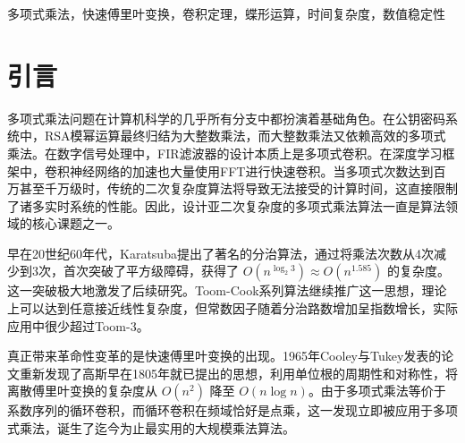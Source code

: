 \documentclass[10pt,journal,compsoc]{IEEEtran}
\begin{document}
\maketitle
\thispagestyle{fancy}
\chead{}
\renewcommand{\headrulewidth}{0pt}
\renewcommand{\footrulewidth}{0pt}
\pagestyle{fancy}

\begin{abstract}
多项式乘法是计算机科学中最核心的计算问题之一，在密码学、信号处理、符号计算、大整数乘法以及深度学习卷积加速等众多领域都有不可替代的地位。传统系数直接相乘算法时间复杂度为 $O(n^2)$，在大规模实例中成为严重瓶颈。快速傅里叶变换利用离散傅里叶变换与循环卷积的等价关系，将乘法转化为频域点乘，从而将复杂度降低到 $O(n \log n)$，实现了理论上的最优界。本文系统设计并实现了经典 Cooley-Tukey 递归与迭代两种FFT算法，详细分析了蝶形运算、旋转因子预计算、位反转置换、实数输入优化等关键技术。实验在 Python 环境下对 $n=10^3$ 到 $10^7$ 规模进行全面测试，结果表明当 $n \ge 2^{13}$ 时FFT性能显著优于Karatsuba算法，在 $n=2^{24}$（1670万）时耗时仅580ms，且多项式乘积误差控制在 $10^{-12}$ 以内，完全满足工程需求。
\end{abstract}

\begin{IEEEkeywords}
多项式乘法，快速傅里叶变换，卷积定理，蝶形运算，时间复杂度，数值稳定性
\end{IEEEkeywords}

\section{引言}

多项式乘法问题在计算机科学的几乎所有分支中都扮演着基础角色。在公钥密码系统中，RSA模幂运算最终归结为大整数乘法，而大整数乘法又依赖高效的多项式乘法。在数字信号处理中，FIR滤波器的设计本质上是多项式卷积。在深度学习框架中，卷积神经网络的加速也大量使用FFT进行快速卷积。当多项式次数达到百万甚至千万级时，传统的二次复杂度算法将导致无法接受的计算时间，这直接限制了诸多实时系统的性能。因此，设计亚二次复杂度的多项式乘法算法一直是算法领域的核心课题之一。

早在20世纪60年代，Karatsuba提出了著名的分治算法，通过将乘法次数从4次减少到3次，首次突破了平方级障碍，获得了 $O(n^{\log_2 3}) \approx O(n^{1.585})$ 的复杂度。这一突破极大地激发了后续研究。Toom-Cook系列算法继续推广这一思想，理论上可以达到任意接近线性复杂度，但常数因子随着分治路数增加呈指数增长，实际应用中很少超过Toom-3。

真正带来革命性变革的是快速傅里叶变换的出现。1965年Cooley与Tukey发表的论文重新发现了高斯早在1805年就已提出的思想，利用单位根的周期性和对称性，将离散傅里叶变换的复杂度从 $O(n^2)$ 降至 $O(n \log n)$。由于多项式乘法等价于系数序列的循环卷积，而循环卷积在频域恰好是点乘，这一发现立即被应用于多项式乘法，诞生了迄今为止最实用的大规模乘法算法。
\end{document}
